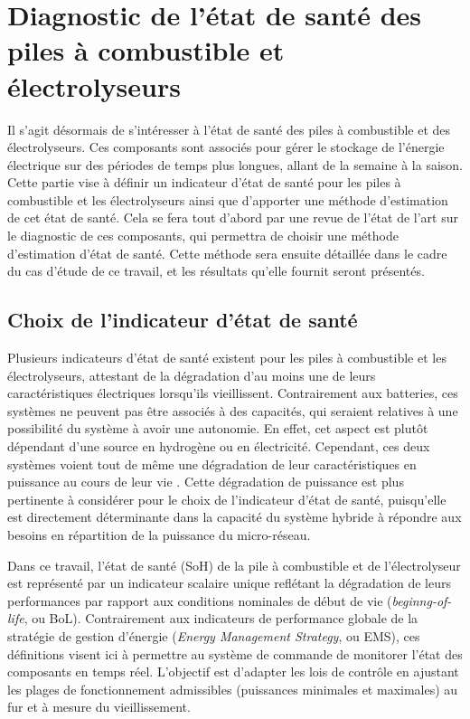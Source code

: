 \section{Diagnostic de l'état de santé des piles à combustible et électrolyseurs}
Il s'agit désormais de s'intéresser à l'état de santé des piles à combustible et des électrolyseurs. Ces composants sont associés pour gérer le stockage de l'énergie électrique sur des périodes de temps plus longues, allant de la semaine à la saison. Cette partie vise à définir un indicateur d'état de santé pour les piles à combustible et les électrolyseurs ainsi que d'apporter une méthode d'estimation de cet état de santé. Cela se fera tout d'abord par une revue de l'état de l'art sur le diagnostic de ces composants, qui permettra de choisir une méthode d'estimation d'état de santé. Cette méthode sera ensuite détaillée dans le cadre du cas d'étude de ce travail, et les résultats qu'elle fournit seront présentés.

\subsection{Choix de l'indicateur d'état de santé}
Plusieurs indicateurs d'état de santé existent pour les piles à combustible et les électrolyseurs, attestant de la dégradation d'au moins une de leurs caractéristiques électriques lorsqu'ils vieillissent. Contrairement aux batteries, ces systèmes ne peuvent pas être associés à des capacités, qui seraient relatives à une possibilité du système à avoir une autonomie. En effet, cet aspect est plutôt dépendant d'une source en hydrogène ou en électricité. Cependant, ces deux systèmes voient tout de même une dégradation de leur caractéristiques en puissance au cours de leur vie \cite{bezmalinovic_characterization_2015}\cite{papakonstantinou_degradation_2020}. Cette dégradation de puissance est plus pertinente à considérer pour le choix de l'indicateur d'état de santé, puisqu'elle est directement déterminante dans la capacité du système hybride à répondre aux besoins en répartition de la puissance du micro-réseau. 

Dans ce travail, l'état de santé (SoH) de la pile à combustible et de l'électrolyseur est représenté par un indicateur scalaire unique reflétant la dégradation de leurs performances par rapport aux conditions nominales de début de vie (\textit{beginng-of-life}, ou BoL). Contrairement aux indicateurs de performance globale de la stratégie de gestion d'énergie (\textit{Energy Management Strategy}, ou EMS), ces définitions visent ici à permettre au système de commande de monitorer l'état des composants en temps réel. L'objectif est d'adapter les lois de contrôle en ajustant les plages de fonctionnement admissibles (puissances minimales et maximales) au fur et à mesure du vieillissement. 

